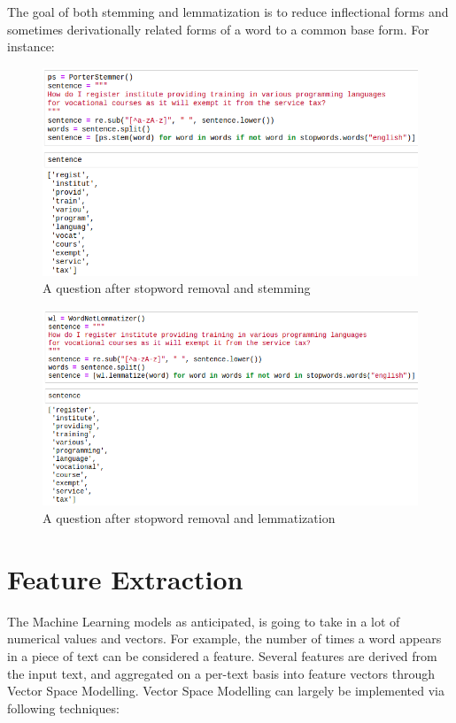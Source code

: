 The goal of both stemming and lemmatization is to reduce inflectional forms and sometimes derivationally related forms of a word to a common base form. For instance:

\begin{figure}[tbh]
\begin{center}
	\includegraphics[width = 5.5in]{images/stem.png}
	\caption{A question after stopword removal and stemming}
	\label{stopwords}
\end{center}
\end{figure}
\newpage
\begin{figure}[tbh]
\begin{center}
	\includegraphics[width = 5.5in]{images/lemma.png}
	\caption{A question after stopword removal and lemmatization}
	\label{stopwords}
\end{center}
\end{figure}


\section{Feature Extraction}
The Machine Learning models as anticipated, is going to take in a lot of numerical values and vectors. For example, the number of times a word appears in a piece of text can be considered a feature. Several features are derived from the input text, and aggregated on a per-text basis into feature vectors through Vector Space Modelling. Vector Space Modelling can largely be implemented via following techniques:

